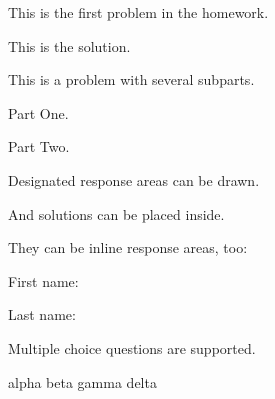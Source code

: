 \documentclass{dscproblemset}
\begin{document}

\nameoneverypage{}

\begin{probset}

    \begin{prob}
        This is the first problem in the homework.

        \begin{soln}
            This is the solution.
        \end{soln}

    \end{prob}

    \begin{prob}
        This is a problem with several subparts.

        \begin{subprobset}
            \begin{subprob}
                Part One.
            \end{subprob}

            \begin{subprob}
                Part Two.
            \end{subprob}
        \end{subprobset}

    \end{prob}

    \begin{prob}
        Designated response areas can be drawn.

        \begin{responsebox}{2in}
            And solutions can be placed inside.
        \end{responsebox}
    \end{prob}

    \begin{prob}
        They can be inline response areas, too:

        First name: 

        Last name: 
    \end{prob}

    \newpage

    \begin{prob}
        Multiple choice questions are supported.

        \begin{choices}
            \choice alpha
            \correctchoice beta
            \choice gamma
            \choice delta
        \end{choices}


\end{prob}
\end{probset}
\end{document}
